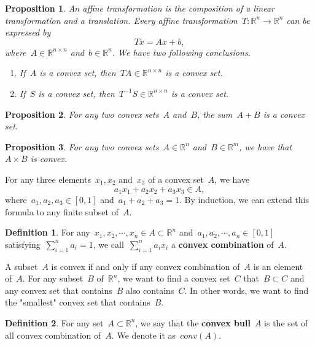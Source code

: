 \documentclass[12pt,a4paper,draft]{article}  %
\newtheorem{proposition}{Proposition}[section]
\theoremstyle{definition}
\newtheorem{definition}{Definition}[section]
\numberwithin{equation}{section}
\newcommand{\RR}{\mathbb{R}}
\begin{document}
\begin{proposition}
    An affine transformation is the composition of a linear transformation and a translation.
    Every affine transformation~$T: \RR^n \rightarrow \RR^n$ can be expressed by
    $$ Tx=Ax+b ,$$
    where~$A \in \RR^{n \times n}$ and~$b \in \RR^n$. We have two following conclusions.
    \begin{enumerate}
        \item If~$A$ is a convex set, then~$TA \in \RR^{n \times n}$ is a convex set.
        \item If~$S$ is a convex set, then~$T^{-1}S \in \RR^{n \times n}$ is a convex set.
    \end{enumerate}
\end{proposition}

\begin{proposition}
    For any two convex sets~$A$ and~$B$, the sum~$A+B$ is a convex set. 
\end{proposition}

\begin{proposition}
    For any two convex sets~$A \in \RR^n$ and~$B \in \RR^m$, we have 
    that~$A \times B$ is convex.
\end{proposition}

For any three elements~$x_1,x_2$ and~$x_3$ of a convex set~$A$, we have
$$ a_1 x_1 + a_2 x_2 + a_3 x_3 \in A, $$
where~$a_1,a_2,a_3 \in \left[ 0,1 \right]$ and~$a_1+a_2+a_3=1$.
By induction, we can extend this formula to any finite subset of~$A$.

\begin{definition}
    For any~$x_1,x_2,\cdots,x_n \in A \subset \RR^n$ and~$a_1,a_2,\cdots,a_n \in \left[0,1\right]$ 
    satisfying~$\sum_{i=1}^{n}a_i=1$, we call~$ \sum_{i=1}^{n}a_i x_i $
    a \textbf{convex combination} of~$A$.
\end{definition}

A subset~$A$ is convex if and only if any convex combination of~$A$ is an element of~$A$.
For any subset~$B$ of~$\RR^n$, we want to find a convex set~$C$ that~$B \subset C$ and any
convex set that contains~$B$ also contains~$C$. In other words, we want to find the "smallest" 
convex set that contains~$B$.

\begin{definition}
    For any set~$A \subset \RR^n$, we say that the \textbf{convex bull}~$A$ is the set of all
    convex combination of~$A$. We denote it as~$conv(A)$.
\end{definition}
\end{document}
